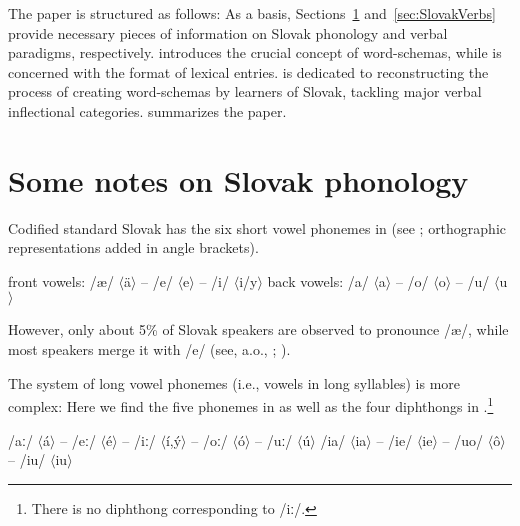 \documentclass[output=paper,colorlinks,citecolor=brown]{langscibook}
\begin{document}
The paper is structured as follows: As a basis, Sections~\ref{sec:SlovakPhonology} and~\ref{sec:SlovakVerbs} provide necessary pieces of information on Slovak phonology and verbal paradigms, respectively.  introduces the crucial concept of word-schemas, while  is concerned with the format of lexical entries.  is dedicated to reconstructing the process of creating word-schemas by learners of Slovak, tackling major verbal inflectional categories.  summarizes the paper.


\section{Some notes on Slovak phonology}\label{sec:SlovakPhonology}

Codified standard Slovak has the six short vowel phonemes in  (see \citealt[534]{Short1993}; orthographic representations added in angle brackets).

\ea\label{ex:ShortVowels}
\ea front vowels: /\ae/ $\langle$ä$\rangle$ -- /e/ $\langle$e$\rangle$ -- /i/ $\langle$i/y$\rangle$ 
\ex back vowels: /a/ $\langle$a$\rangle$ -- /o/ $\langle$o$\rangle$ -- /u/ $\langle$u$\rangle$
\z\z

\noindent However, only about 5\% of Slovak speakers are observed to pronounce /\ae/, while most speakers merge it with /e/ (see, a.o., \citealt[534]{Short1993}; \citealt[375]{Hanulikova.Hamann2010}).

The system of long vowel phonemes (i.e., vowels in long syllables) is more complex: Here we find the five phonemes in  as well as the four diphthongs in  \citep[see][534]{Short1993}.\footnote{There is no diphthong corresponding to /iː/.}

\ea
\ea /aː/ $\langle$á$\rangle$ -- /eː/ $\langle$é$\rangle$ -- /iː/ $\langle$í,ý$\rangle$ -- /oː/ $\langle$ó$\rangle$ -- /uː/ $\langle$ú$\rangle$ \label{ex:LongVowels}
\ex /ia/ $\langle$ia$\rangle$ -- /ie/ $\langle$ie$\rangle$ -- /uo/ $\langle$ô$\rangle$ -- /iu/ $\langle$iu$\rangle$ \label{ex:Diphthongs}
\z\z
\end{document}
